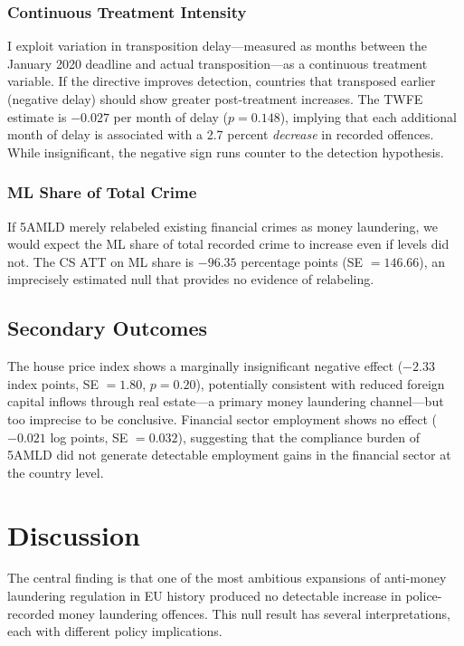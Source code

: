 \documentclass[12pt]{article}
\begin{document}
\subsubsection*{Continuous Treatment Intensity}
I exploit variation in transposition delay---measured as months between the January 2020 deadline and actual transposition---as a continuous treatment variable. If the directive improves detection, countries that transposed earlier (negative delay) should show greater post-treatment increases. The TWFE estimate is $-0.027$ per month of delay ($p = 0.148$), implying that each additional month of delay is associated with a 2.7 percent \textit{decrease} in recorded offences. While insignificant, the negative sign runs counter to the detection hypothesis.

\subsubsection*{ML Share of Total Crime}
If 5AMLD merely relabeled existing financial crimes as money laundering, we would expect the ML share of total recorded crime to increase even if levels did not. The CS ATT on ML share is $-96.35$ percentage points (SE $= 146.66$), an imprecisely estimated null that provides no evidence of relabeling.



\subsection{Secondary Outcomes}

The house price index shows a marginally insignificant negative effect ($-2.33$ index points, SE $= 1.80$, $p = 0.20$), potentially consistent with reduced foreign capital inflows through real estate---a primary money laundering channel---but too imprecise to be conclusive. Financial sector employment shows no effect ($-0.021$ log points, SE $= 0.032$), suggesting that the compliance burden of 5AMLD did not generate detectable employment gains in the financial sector at the country level.

\section{Discussion}
\label{sec:discussion}

The central finding is that one of the most ambitious expansions of anti-money laundering regulation in EU history produced no detectable increase in police-recorded money laundering offences. This null result has several interpretations, each with different policy implications.
\end{document}
